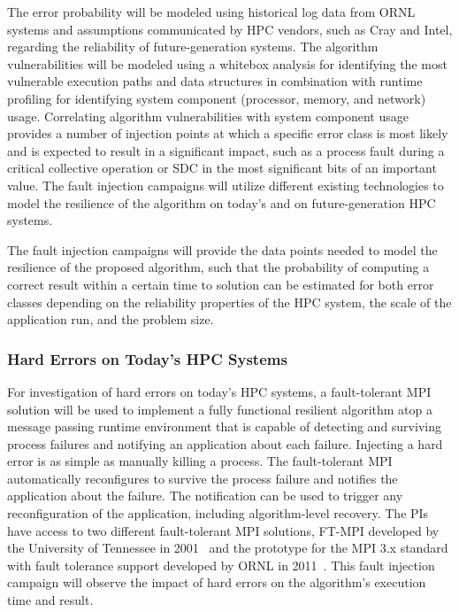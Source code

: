 The error probability will be modeled using historical log data from ORNL
systems and assumptions communicated by HPC vendors, such as Cray and Intel,
regarding the reliability of future-generation systems. The algorithm
vulnerabilities will be modeled using a whitebox analysis for identifying the
most vulnerable execution paths and data structures in combination with
runtime profiling for identifying system component (processor, memory, and
network) usage. Correlating algorithm vulnerabilities with system component
usage provides a number of injection points at which a specific error class is
most likely and is expected to result in a significant impact, such as a
process fault during a critical collective operation or SDC in the most
significant bits of an important value. The fault injection campaigns will
utilize different existing technologies to model the resilience of the
algorithm on today's and on future-generation HPC systems.

The fault injection campaigns will provide the data points needed to model the
resilience of the proposed algorithm, such that the probability of computing a
correct result within a certain time to solution can be estimated for both
error classes depending on the reliability properties of the HPC system, the
scale of the application run, and the problem size.

\subsubsection{Hard Errors on Today's HPC Systems}

For investigation of hard errors on today's HPC systems, a fault-tolerant MPI
solution will be used to implement a fully functional resilient algorithm atop
a message passing runtime environment that is capable of detecting and
surviving process failures and notifying an application about each failure. Injecting a
hard error is as simple as manually killing a process. The fault-tolerant MPI
automatically reconfigures to survive the process failure and notifies the
application about the failure. The notification can be used to trigger any
reconfiguration of the application, including algorithm-level recovery. The
PIs have access to two different fault-tolerant MPI solutions, FT-MPI
developed by the University of Tennessee in 2001~\cite{fagg01harness,
  fagg01fault} and the prototype for the MPI 3.x standard with fault tolerance
support developed by ORNL in 2011~\cite{hursey12:parco:hips, hursey11:ft_ring,
  hursey11:ft_coll}. This fault injection campaign will observe the impact of
hard errors on the algorithm's execution time and result.

